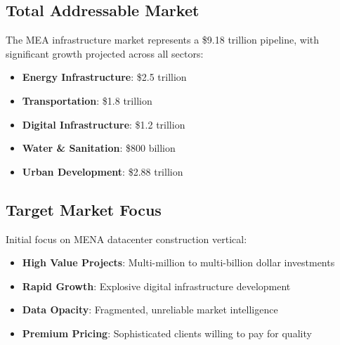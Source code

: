 \documentclass[business]{../templates/infraradar-main}
\begin{document}
\subsection{Total Addressable Market}
The MEA infrastructure market represents a \$9.18 trillion pipeline, with significant growth projected across all sectors:
\begin{itemize}
    \item \textbf{Energy Infrastructure}: \$2.5 trillion
    \item \textbf{Transportation}: \$1.8 trillion
    \item \textbf{Digital Infrastructure}: \$1.2 trillion
    \item \textbf{Water \& Sanitation}: \$800 billion
    \item \textbf{Urban Development}: \$2.88 trillion
\end{itemize}

\subsection{Target Market Focus}
Initial focus on MENA datacenter construction vertical:
\begin{itemize}
    \item \textbf{High Value Projects}: Multi-million to multi-billion dollar investments
    \item \textbf{Rapid Growth}: Explosive digital infrastructure development
    \item \textbf{Data Opacity}: Fragmented, unreliable market intelligence
    \item \textbf{Premium Pricing}: Sophisticated clients willing to pay for quality
\end{itemize}
\end{document}
